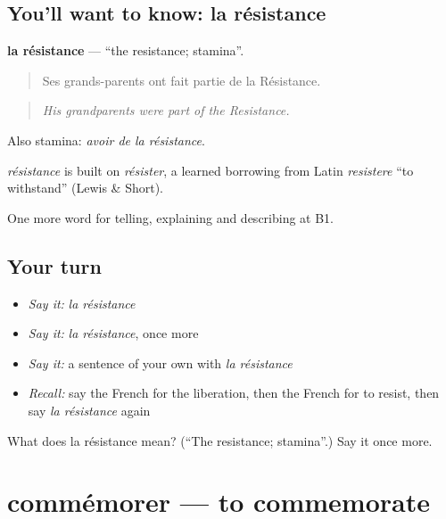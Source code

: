\subsection*{You'll want to know: la résistance}
\textbf{la résistance} — \textquotedblleft{}the resistance; stamina\textquotedblright{}.

\begin{quote}
Ses grands-parents ont fait partie de la Résistance.
\end{quote}

\begin{quote}
\emph{His grandparents were part of the Resistance.}
\end{quote}

Also stamina: \emph{avoir de la résistance}.

\begin{cousinweb}
\emph{résistance} is built on \emph{résister}, a learned borrowing from Latin \emph{resistere} \textquotedblleft{}to withstand\textquotedblright{} (Lewis \& Short).
\end{cousinweb}

\begin{grammarlens}[title={What you've built}]
One more word for telling, explaining and describing at B1.
\end{grammarlens}

\subsection*{Your turn}
\begin{itemize}
\raggedright
  \item \emph{Say it:} \emph{la résistance}
  \item \emph{Say it:} \emph{la résistance}, once more
  \item \emph{Say it:} a sentence of your own with \emph{la résistance}
  \item \emph{Recall:} say the French for the liberation, then the French for to resist, then say \emph{la résistance} again
\end{itemize}

\begin{tcolorbox}[breakable,colback=teal!4,colframe=teal!35!black,title={Before you move on}]
What does la résistance mean? (\textquotedblleft{}The resistance; stamina\textquotedblright{}.) Say it once more.
\end{tcolorbox}
\section[commémorer]{commémorer — to commemorate}

